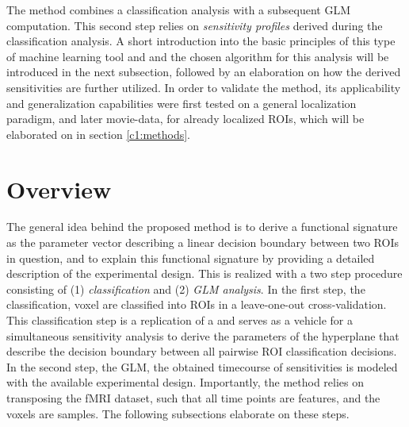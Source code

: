 \documentclass[a4paper, 12pt]{scrreprt}
\begin{document}
The method combines a classification analysis with a subsequent GLM computation. This second step relies on \textit{sensitivity profiles} derived during the classification analysis. A short introduction into the basic principles of this type of machine learning tool and and the chosen algorithm for this analysis will be introduced in the next subsection, followed by an elaboration on how the derived sensitivities are further utilized. In order to validate the method, its applicability and generalization capabilities were first tested on a general localization paradigm, and later movie-data, for already localized ROIs, which will be elaborated on in section \ref{c1:methods}.


\section{Overview}
The general idea behind the proposed method is to derive a functional signature as the parameter vector describing a linear decision boundary between two ROIs in question, and to explain this functional signature by providing a detailed description of the experimental design. This is realized with a two step procedure consisting of (1) \textit{classification} and (2)\textit{ GLM analysis}.  In the first step, the classification, voxel are classified into ROIs in a leave-one-out cross-validation. This classification step is a replication of a \textcite{nastase2016} and serves as a vehicle for a simultaneous sensitivity analysis to derive the parameters of the hyperplane that describe the decision boundary between all pairwise ROI classification decisions. In the second step, the GLM, the obtained timecourse of sensitivities is modeled with the available experimental design. Importantly, the method relies on transposing the fMRI dataset, such that all time points are features, and the voxels are samples. The following subsections elaborate on these steps. \newline
\end{document}

